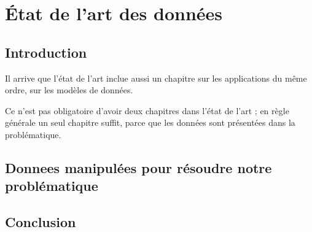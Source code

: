 \chapter{État de l'art des données}
\minitoc
\newpage

\section{Introduction}

Il arrive que l'état de l'art inclue aussi un chapitre sur les applications du même ordre, sur les modèles de données.

Ce n'est pas obligatoire d'avoir deux chapitres dans l'état de l'art ; en règle générale un seul chapitre suffit, parce que les données sont présentées dans la problématique.

\section{Donnees manipulées pour résoudre notre problématique}

\section{Conclusion}